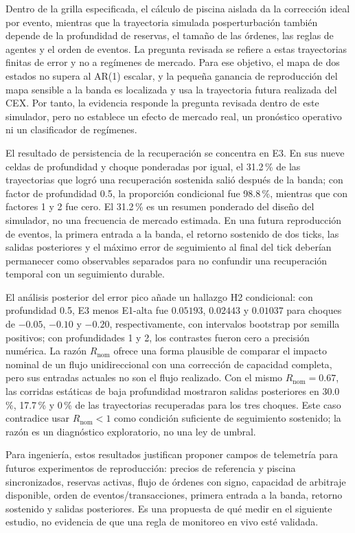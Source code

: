 Dentro de la grilla especificada, el cálculo de piscina aislada da la corrección ideal por evento, mientras que la trayectoria simulada posperturbación también depende de la profundidad de reservas, el tamaño de las órdenes, las reglas de agentes y el orden de eventos. La pregunta revisada se refiere a estas trayectorias finitas de error y no a regímenes de mercado. Para ese objetivo, el mapa de dos estados no supera al AR(1) escalar, y la pequeña ganancia de reproducción del mapa sensible a la banda es localizada y usa la trayectoria futura realizada del CEX. Por tanto, la evidencia responde la pregunta revisada dentro de este simulador, pero no establece un efecto de mercado real, un pronóstico operativo ni un clasificador de regímenes.

El resultado de persistencia de la recuperación se concentra en E3. En sus nueve celdas de profundidad y choque ponderadas por igual, el 31.2\,\% de las trayectorias que logró una recuperación sostenida salió después de la banda; con factor de profundidad 0.5, la proporción condicional fue 98.8\,\%, mientras que con factores 1 y 2 fue cero. El 31.2\,\% es un resumen ponderado del diseño del simulador, no una frecuencia de mercado estimada. En una futura reproducción de eventos, la primera entrada a la banda, el retorno sostenido de dos ticks, las salidas posteriores y el máximo error de seguimiento al final del tick deberían permanecer como observables separados para no confundir una recuperación temporal con un seguimiento durable.

El análisis posterior del error pico añade un hallazgo H2 condicional: con profundidad 0.5, E3 menos E1-alta fue $0.05193$, $0.02443$ y $0.01037$ para choques de $-0.05$, $-0.10$ y $-0.20$, respectivamente, con intervalos bootstrap por semilla positivos; con profundidades 1 y 2, los contrastes fueron cero a precisión numérica. La razón $R_{\mathrm{nom}}$ ofrece una forma plausible de comparar el impacto nominal de un flujo unidireccional con una corrección de capacidad completa, pero sus entradas actuales no son el flujo realizado. Con el mismo $R_{\mathrm{nom}}=0.67$, las corridas estáticas de baja profundidad mostraron salidas posteriores en 30.0\,\%, 17.7\,\% y 0\,\% de las trayectorias recuperadas para los tres choques. Este caso contradice usar $R_{\mathrm{nom}}<1$ como condición suficiente de seguimiento sostenido; la razón es un diagnóstico exploratorio, no una ley de umbral.

Para ingeniería, estos resultados justifican proponer campos de telemetría para futuros experimentos de reproducción: precios de referencia y piscina sincronizados, reservas activas, flujo de órdenes con signo, capacidad de arbitraje disponible, orden de eventos/transacciones, primera entrada a la banda, retorno sostenido y salidas posteriores. Es una propuesta de qué medir en el siguiente estudio, no evidencia de que una regla de monitoreo en vivo esté validada.


